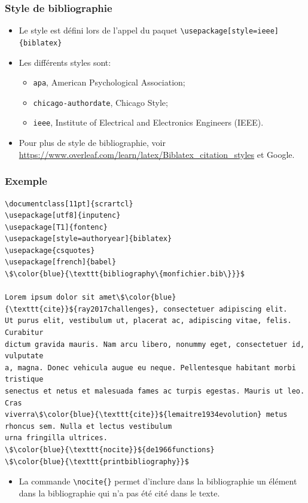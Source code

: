 \begin{frame}[fragile]
  \frametitle{Style de bibliographie}
  \begin{itemize}
      \item Le style est défini lors de l'appel du paquet \lstinline|\usepackage[style=ieee]{biblatex}|
      \item Les différents styles sont:
      \begin{itemize}
          \item \texttt{apa}, American Psychological Association;
          \item \texttt{chicago-authordate}, Chicago Style;
          \item \texttt{ieee}, Institute of Electrical and Electronics Engineers (IEEE).
      \end{itemize}
      \item Pour plus de style de bibliographie, voir \url{https://www.overleaf.com/learn/latex/Biblatex_citation_styles} et Google.
  \end{itemize}
\end{frame}

\begin{frame}[fragile]
  \frametitle{Exemple}
  \begin{lstlisting}[style=nonumbers,mathescape]
\documentclass[11pt]{scrartcl}
\usepackage[utf8]{inputenc}
\usepackage[T1]{fontenc}
\usepackage[style=authoryear]{biblatex}
\usepackage{csquotes}
\usepackage[french]{babel}
\$\color{blue}{\texttt{bibliography\{monfichier.bib\}}}$

Lorem ipsum dolor sit amet\$\color{blue}{\texttt{cite}}${ray2017challenges}, consectetuer adipiscing elit.
Ut purus elit, vestibulum ut, placerat ac, adipiscing vitae, felis. Curabitur
dictum gravida mauris. Nam arcu libero, nonummy eget, consectetuer id, vulputate
a, magna. Donec vehicula augue eu neque. Pellentesque habitant morbi tristique
senectus et netus et malesuada fames ac turpis egestas. Mauris ut leo. Cras
viverra\$\color{blue}{\texttt{cite}}${lemaitre1934evolution} metus rhoncus sem. Nulla et lectus vestibulum
urna fringilla ultrices.
\$\color{blue}{\texttt{nocite}}${de1966functions}
\$\color{blue}{\texttt{printbibliography}}$

  \end{lstlisting}
  \begin{itemize}
      \item La commande \lstinline|\nocite{}| permet d'inclure dans la bibliographie un élément dans la bibliographie qui n'a pas été cité dans le texte.
  \end{itemize}
\end{frame}

